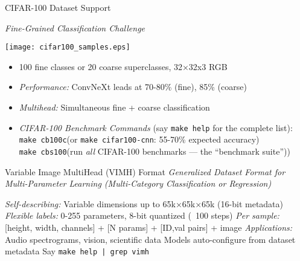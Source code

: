 \begin{slide}[\slideopts,toc={CIFAR-100}]{CIFAR-100 Dataset Support}
  
  \vspace{-1em}
  
  \emph{Fine-Grained Classification Challenge}

  \vspace{0.5em}

    \texttt{[image: cifar100\_samples.eps]}
  
  \vspace{-0.5em}

  \begin{itemize}
    \item 100 fine classes or 20 coarse superclasses, 32×32x3 RGB
    
    \item \emph{Performance:} ConvNeXt leads at 70-80\% (fine), 85\% (coarse)
    
    \item \emph{Multihead:} Simultaneous fine + coarse classification
    
    \item \emph{CIFAR-100 Benchmark Commands} (say \texttt{make help} for the complete list):\\
      \;\texttt{make cb100c}\quad (or \texttt{make cifar100-cnn}: 55-70\% expected accuracy)\\
      \;\texttt{make cbs100}\quad (run \emph{all} CIFAR-100 benchmarks --- the ``benchmark suite''))

  \end{itemize}
  
\end{slide}

\begin{wideslidewhite}[\slideopts,toc={VIMH}]{Variable Image MultiHead (VIMH) Format}
  \vspace{-2em}
  \emph{Generalized Dataset Format for Multi-Parameter Learning (Multi-Category Classification or Regression)}
  \vspace{-2em}
  \vspace{-2em}
  \begin{itemize}
    \mpitem \emph{Self-describing:} Variable dimensions up to 65k×65k×65k (16-bit metadata)
    \mpitem \emph{Flexible labels:} 0-255 parameters, 8-bit quantized (~100 steps)
    \mpitem \emph{Per sample:} [height, width, channels] + [N params] + [ID,val pairs] + image
    \mpitem \emph{Applications:} Audio spectrograms, vision, scientific data
    \mpitem Models auto-configure from dataset metadata
    \mpitem Say \texttt{make help | grep vimh}
  \end{itemize}
\end{wideslidewhite}
  
